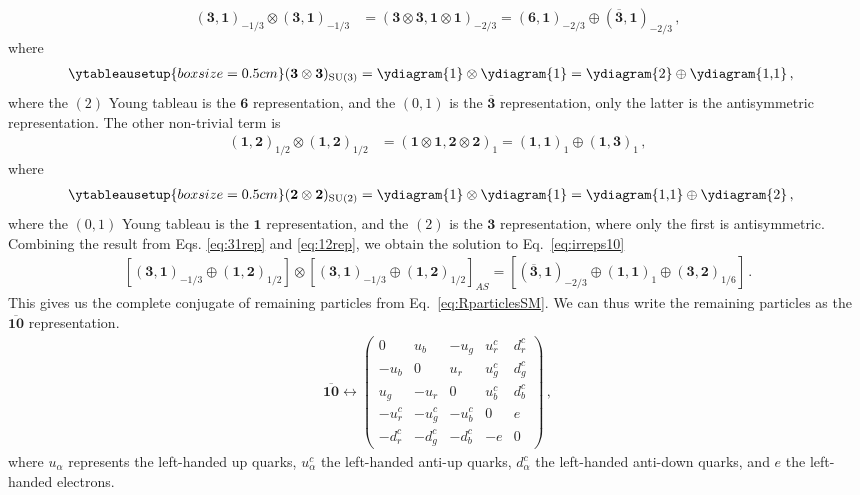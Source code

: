\begin{align}
    (\mathbf{3},\mathbf{1})_{-1/3} \otimes (\mathbf{3},\mathbf{1})_{-1/3} &= (\mathbf{3} \otimes \mathbf{3}, \mathbf{1} \otimes \mathbf{1})_{-2/3} = (\mathbf{6},\mathbf{1})_{-2/3} \oplus (\overline{\mathbf{3}},\mathbf{1})_{-2/3}\,,\label{eq:31rep}
\end{align}
where
\begin{align}
    \ytableausetup{boxsize=0.5cm}
    (\mathbf{3} \otimes \mathbf{3})_{\text{SU}(3)} &= \vcenter{\hbox{\ydiagram{1}}} \otimes \vcenter{\hbox{\ydiagram{1}}} = \vcenter{\hbox{\ydiagram{2}}} \oplus \vcenter{\hbox{\ydiagram{1,1}}}\,,
\end{align}
where the $(2)$ Young tableau is the $\mathbf{6}$ representation, and the $(0,1)$ is the $\overline{\mathbf{3}}$ representation, only the latter is the antisymmetric representation. The other non-trivial term is
\begin{align}
    (\mathbf{1},\mathbf{2})_{1/2} \otimes (\mathbf{1},\mathbf{2})_{1/2} &= (\mathbf{1} \otimes \mathbf{1}, \mathbf{2} \otimes \mathbf{2})_1 = (\mathbf{1},\mathbf{1})_1 \oplus (\mathbf{1},\mathbf{3})_1 \,,\label{eq:12rep}
\end{align}
where
\begin{align}
    \ytableausetup{boxsize=0.5cm}
    (\mathbf{2} \otimes \mathbf{2})_{\text{SU}(2)} &= \vcenter{\hbox{\ydiagram{1}}} \otimes \vcenter{\hbox{\ydiagram{1}}} = \vcenter{\hbox{\ydiagram{1,1}}} \oplus \vcenter{\hbox{\ydiagram{2}}} \,,
\end{align}
where the $(0,1)$ Young tableau is the $\mathbf{1}$ representation, and the $(2)$ is the $\mathbf{3}$ representation, where only the first is antisymmetric. Combining the result from Eqs. \eqref{eq:31rep} and \eqref{eq:12rep}, we obtain the solution to Eq.~\eqref{eq:irreps10}
\begin{align}
    \left[(\mathbf{3},\mathbf{1})_{-1/3}\oplus(\mathbf{1},\mathbf{2})_{1/2}\right]\otimes \left[(\mathbf{3},\mathbf{1})_{-1/3}\oplus(\mathbf{1},\mathbf{2})_{1/2}\right]_{AS}=\left[(\overline{\mathbf{3}},\mathbf{1})_{-2/3}\oplus(\mathbf{1},\mathbf{1})_{1}\oplus(\mathbf{3},\mathbf{2})_{1/6}\right]\,.\label{eq:irreps10_2}
\end{align}
This gives us the complete conjugate of remaining particles from Eq.~\eqref{eq:RparticlesSM}. We can thus write the remaining particles as the $\overline{\mathbf{10}}$ representation.
\begin{align}
\overline{\mathbf{10}} \leftrightarrow 
\begin{pmatrix}
    0 & u_b & -u_g & u_r^c & d_r^c \\
    -u_b & 0 & u_r & u_g^c & d_g^c \\
    u_g & -u_r & 0 & u_b^c & d_b^c \\
    -u_r^c & -u_g^c & -u_b^c & 0 & e \\
    -d_r^c & -d_g^c & -d_b^c & -e & 0
\end{pmatrix} \,,\label{eq:10barrep}
\end{align}
where $u_\alpha$ represents the left-handed up quarks, $u_\alpha^c$ the left-handed anti-up quarks, $d_\alpha^c$ the left-handed anti-down quarks, and $e$ the left-handed electrons.
  
